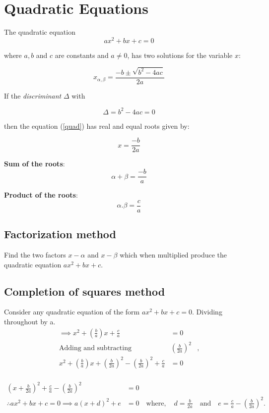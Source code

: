 \section{Quadratic Equations}

The quadratic equation 
\begin{equation}
\label{quad}
ax^2+bx+c = 0
\end{equation}

where \(a,b\) and \(c\) are constants and \(a \neq 0\), has two solutions for the variable \(x\):

\begin{equation}
\label{root}
x_{\alpha,\beta} = \frac{-b \pm \sqrt{b^2 - 4ac}}{2a}
\end{equation}

If the \emph{discriminant} \( \Delta \) with 

\begin{equation}
\label{delta}
\Delta = b^2 - 4ac = 0
\end{equation}

then the equation (\ref{quad}) has real and equal roots given by:

\begin{equation}
\label{equal_root}
x = \frac{-b}{2a}
\end{equation}

\textbf{Sum of the roots}:
\begin{equation}
\label{sum_root}
\alpha + \beta = \frac{-b}{a}
\end{equation}

\textbf{Product of the roots}:
\begin{equation}
\label{product_root}
\alpha.\beta = \frac{c}{a}
\end{equation}

\subsection{Factorization method}
Find the two factors $x-\alpha$ and $x-\beta$ which when multiplied produce the quadratic equation $ax^2+bx+c$. 

\subsection{Completion of squares method}
Consider any quadratic equation of the form $ax^2+bx+c = 0$. Dividing throughout by a.
\begin{align*}
\implies x^2+ \left(\frac{b}{a}\right) x +\frac{c}{a} &=0\\
\text{Adding and subtracting} &\left(\frac{b}{2a}\right)^{2}&,\\
x^2 + \left(\frac{b}{a}\right)x + \left(\frac{b}{2a}\right)^{2} - \left(\frac{b}{2a}\right)^{2} + \frac{c}{a} &=0\\
\end{align*}

\vspace{-10mm}

\begin{align*}
\left(x + \frac{b}{2a} \right)^{2} + \frac{c}{a} - \left(\frac{b}{2a}\right)^{2} &=0\\
\therefore ax^2+bx+c = 0 \implies a(x+d)^{2} + e &=0 \quad \text{where},\quad
d =\frac{b}{2a} \quad \text{and} \quad e = \frac{c}{a} - \left(\frac{b}{2a}\right)^{2}.
\end{align*}